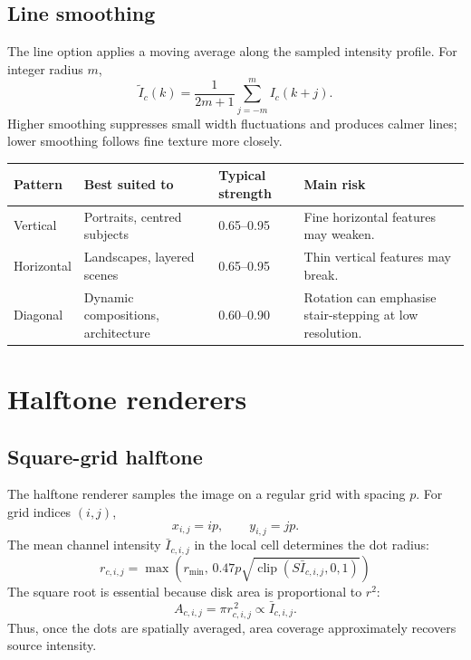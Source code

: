 \documentclass[10.5pt,a4paper]{article}
\newcommand{\clip}{\operatorname{clip}}
\begin{document}
\subsection{Line smoothing}
The line option applies a moving average along the sampled intensity profile. For integer radius $m$,
\begin{equation}
\widetilde I_c(k)=\frac{1}{2m+1}\sum_{j=-m}^{m}I_c(k+j).
\end{equation}
Higher smoothing suppresses small width fluctuations and produces calmer lines; lower smoothing follows fine texture more closely.

\begin{tabularx}{\linewidth}{@{}lXXX@{}}
\toprule
Pattern & Best suited to & Typical strength & Main risk \\
\midrule
Vertical & Portraits, centred subjects & 0.65--0.95 & Fine horizontal features may weaken. \\
Horizontal & Landscapes, layered scenes & 0.65--0.95 & Thin vertical features may break. \\
Diagonal & Dynamic compositions, architecture & 0.60--0.90 & Rotation can emphasise stair-stepping at low resolution. \\
\bottomrule
\end{tabularx}

\section{Halftone renderers}
\subsection{Square-grid halftone}
The halftone renderer samples the image on a regular grid with spacing $p$. For grid indices $(i,j)$,
\begin{equation}
x_{i,j}=ip,\qquad y_{i,j}=jp.
\end{equation}
The mean channel intensity $\bar I_{c,i,j}$ in the local cell determines the dot radius:
\begin{equation}
\boxed{
r_{c,i,j}=\max\!\left(r_{\min},\,0.47p\sqrt{\clip(S\bar I_{c,i,j},0,1)}\right)
}
\end{equation}
The square root is essential because disk area is proportional to $r^2$:
\begin{equation}
A_{c,i,j}=\pi r_{c,i,j}^{\,2}\propto \bar I_{c,i,j}.
\end{equation}
Thus, once the dots are spatially averaged, area coverage approximately recovers source intensity.
\end{document}
